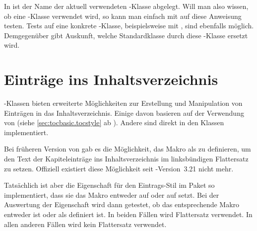 \begin{Declaration}
\end{Declaration}
In  ist der Name der aktuell verwendeten
\KOMAScript-Klasse abgelegt. Will man also wissen, ob eine \KOMAScript-Klasse
verwendet wird, so kann man einfach mit  auf diese
Anweisung testen. Tests auf eine konkrete \KOMAScript-Klasse, beispielsweise
mit , sind ebenfalls möglich. Demgegenüber gibt
 Auskunft, welche Standardklasse durch diese
\KOMAScript-Klasse ersetzt wird.%
\iffalse%
\par
Es\textnote{Achtung!} sei in diesem Zusammenhang darauf hingewiesen, dass
dagegen die Existenz von
\DescRef{scrbase.cmd.KOMAScript}\IndexCmd{KOMAScript} nicht als Indiz für die
Verwendung einer \KOMAScript-Klasse dienen kann. Zum einen definieren alle
\KOMAScript-Pakete diese Anweisung, zum anderen können auch andere Pakete es
für sinnvoll erachten, das \KOMAScript-Piktogramm unter diesem Namen zu
definieren.%
\fi%
\EndIndexGroup


\section{Einträge ins Inhaltsverzeichnis}

\KOMAScript-Klassen bieten erweiterte Möglichkeiten zur Erstellung und
Manipulation von Einträgen in das Inhaltsverzeichnis. Einige davon basieren
auf der Verwendung von  (siehe
\autoref{sec:tocbasic.tocstyle} ab
). Andere sind direkt in den Klassen
implementiert.


\begin{Declaration}
\end{Declaration}
Bei früheren Version
von \KOMAScript{} gab es die Möglichkeit, das Makro 
als  zu definieren, um den Text der Kapiteleinträge ins
Inhaltsverzeichnis im linksbündigen Flattersatz zu setzen. Offiziell existiert
diese Möglichkeit seit \KOMAScript-Version~3.21 nicht mehr.

Tatsächlich ist aber die Eigenschaft  für den
Eintrags-Stil  im Paket
\hyperref[cha:tocbasic]{} so
implementiert, dass sie das Makro 
entweder auf  oder auf  setzt. Bei der
Auswertung der Eigenschaft wird dann getestet, ob das entsprechende Makro
entweder  ist oder als  definiert
ist. In beiden Fällen wird Flattersatz verwendet. In allen anderen Fällen wird
kein Flattersatz verwendet.

